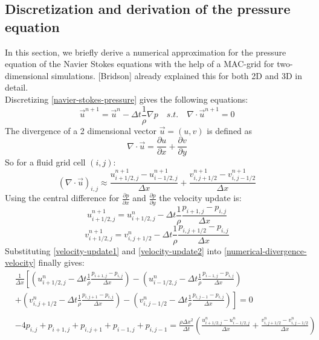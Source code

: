 \subsection{Discretization and derivation of the pressure equation}
In this section, we briefly derive a numerical approximation for the pressure equation of the Navier Stokes equations with the help of a MAC-grid for two-dimensional simulations. [Bridson] already explained this for both 2D and 3D in detail.\\
Discretizing \ref{navier-stokes-pressure} gives the following equations:
\begin{equation} \label{navier-stokes-pressure-numerical1}
    \vec{u}^{n+1} = \vec{u}^{n} - \Delta t \frac{1}{\rho} \nabla p \quad s.t. \quad \nabla \cdot \vec{u}^{n+1} = 0
\end{equation}
The divergence of a 2 dimensional vector $\vec{u} = (u, v)$ is defined as
\begin{equation} \label{general-divergence}
    \nabla \cdot \vec{u} = \frac{\partial u}{\partial x} + \frac{\partial v}{\partial y}
\end{equation}
So for a fluid grid cell $(i, j)$:
\begin{equation} \label{numerical-divergence-velocity}
    (\nabla \cdot \vec{u})_{i,j} \approx \frac{u_{i+1/2,j}^{n+1} - u_{i-1/2,j}^{n+1}}{\Delta x} + \frac{v_{i,j+1/2}^{n+1} - v_{i,j-1/2}^{n+1}}{\Delta x}
\end{equation}
Using the central difference for $\frac{\partial p}{\partial x}$ and $\frac{\partial p}{\partial y}$ the velocity update is:
\begin{equation} \label{velocity-update1}
    u_{i+1/2,j}^{n+1} = u_{i+1/2,j}^{n} - \Delta t \frac{1}{\rho} \frac{p_{i+1,j} - p_{i,j}}{\Delta x}
\end{equation}
\begin{equation} \label{velocity-update2}
v_{i+1/2,j}^{n+1} = v_{i,j+1/2}^{n} - \Delta t \frac{1}{\rho} \frac{p_{i,j+1/2} - p_{i,j}}{\Delta x}
\end{equation}
Substituting \ref{velocity-update1} and \ref{velocity-update2} into \ref{numerical-divergence-velocity} finally gives:
\begin{equation} \label{pressure-equation}
    \begin{aligned}
        & \frac{1}{\Delta x}\left[\left(u_{i+1/2,j}^{n} - \Delta t \frac{1}{\rho} \frac{p_{i+1,j} - p_{i,j}}{\Delta x}\right) - \left(u_{i-1/2,j}^{n} - \Delta t \frac{1}{\rho} \frac{p_{i-1,j} - p_{i,j}}{\Delta x}\right) \right. \\
        & + \left. \left(v_{i,j+1/2}^{n} - \Delta t \frac{1}{\rho} \frac{p_{i,j+1} - p_{i,j}}{\Delta x}\right) - \left(v_{i,j-1/2}^{n} - \Delta t \frac{1}{\rho} \frac{p_{i,j-1} - p_{i,j}}{\Delta x} \right) \right] = 0 \\\\
        &  - 4p_{i,j} + p_{i+1,j} + p_{i,j+1} + p_{i-1,j} + p_{i,j-1} = \frac{\rho \Delta x^2}{\Delta t} \left( \frac{u_{i+1/2,j}^{n} - u_{i-1/2,j}^{n}}{\Delta x} + \frac{v_{i,j+1/2}^{n} - v_{i,j-1/2}^{n}}{\Delta x} \right)
\end{aligned}
\end{equation}
